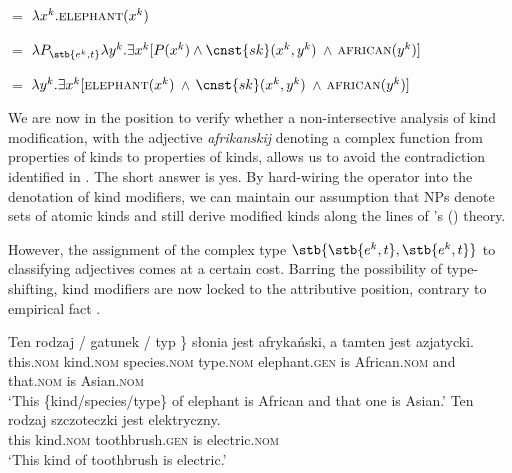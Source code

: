 \documentclass[output=paper]{langscibook}
\begin{document}
\ea \label{ex:final_deriv}
\ea {} $=$ $\lambda x^k.\textsc{elephant}(x^k)$ \label{ex:final_deriv_1}

\ex {} $=$ $\lambda P_{\stb{e^k, t}}\lambda y^k. \exists x^k [P(x^k) \wedge \cnst{sk}(x^k, y^k)$ $\wedge$ $\textsc{african}(y^k)]$ \label{ex:final_deriv_2}

\ex {} $=$ $\lambda y^k. \exists x^k [\textsc{elephant}(x^k)$ $\wedge$ $\cnst{sk}(x^k, y^k)$ $\wedge$ $ \textsc{african}(y^k)]$
\label{ex:final_deriv_3}
\z \z

\noindent
We are now in the position to verify whether a non-intersective analysis of kind modification, with the adjective \textit{afrikanskij} denoting a complex function from properties of kinds to properties of kinds, allows us to avoid the contradiction identified in . The short answer is yes. By hard-wiring the  operator into the denotation of kind modifiers, we can maintain our assumption that NPs denote sets of atomic kinds and still derive modified kinds along the lines of \citeauthor{Borik.Espinal2012}'s (\citeyear{Borik.Espinal2012,Borik.Espinal2015}) theory.

\sloppy However, the assignment of the complex type $\stb{\stb{e^k,t}, \stb{e^k,t}}$ to classifying adjectives comes at a certain cost.
Barring the possibility of type-shifting, kind modifiers are now locked to the attributive position, contrary to empirical fact .

\ea \label{ex:predicative_modifier}
\ea \gll
Ten \minsp{\{} rodzaj / gatunek / typ \} słonia jest afrykański, a tamten jest azjatycki.\\
this.\textsc{nom} {} kind.\textsc{nom} { } species.\textsc{nom} { } type.\textsc{nom} { } elephant.\textsc{gen} is African.\textsc{nom} and that.\textsc{nom} is Asian.\textsc{nom}\\
\glt `This \{kind/species/type\} of elephant is African and that one is Asian.'
\ex \gll
Ten rodzaj szczoteczki jest elektryczny.\\
this kind.\textsc{nom} toothbrush.\textsc{gen} is electric.\textsc{nom}\\
\glt `This kind of toothbrush is electric.'
\z \z
\end{document}
